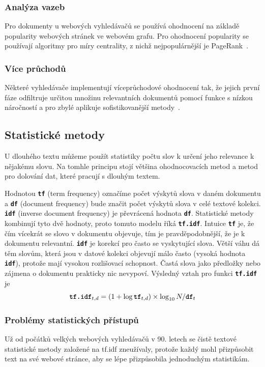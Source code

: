 \documentclass[11pt,letterpaper,oneside,openright]{book}
\newcommand{\bftt}[1]{\texttt{\textbf{#1}}}
\begin{document}
\subsubsection{Analýza vazeb}
Pro dokumenty u webových vyhledávačů se používá ohodnocení na základě
popularity webových stránek ve webovém grafu. Pro ohodnocení popularity se
používají algoritmy pro míry centrality, z nichž nejpopulárnější je
PageRank~\cite{Page99thepagerank}.

\subsubsection{Více průchodů}
Některé vyhledávače implementují víceprůchodové ohodnocení tak, že jejich první
fáze odfiltruje určitou množinu relevantních dokumentů pomocí funkce s nízkou
náročností a pro zbylé aplikuje sofistikovanější
metody~\cite{Yin:2016:RRY:2939672.2939677}.

\subsection{Statistické metody}
U dlouhého textu můžeme použít statistiky počtu slov k určení jeho relevance k
nějakému slovu. Na tomhle principu stojí většina ohodnocovacích metod a metod
pro dolování dat, které pracují s dlouhým textem.

Hodnotou \bftt{tf} (term frequency) označíme počet výskytů slova v daném
dokumentu a \bftt{df} (document frequency) bude značit počet výskytů slova v
celé textové kolekci. \bftt{idf} (inverse document frequency) je převrácená
hodnota \bftt{df}. Statistické metody kombinují tyto dvě hodnoty, proto tomuto
modelu říká \bftt{tf.idf}. Intuice \bftt{tf} je, že čím vícekrát se slovo v
dokumentu objevuje, tím je pravděpodobnější, že je k dokumentu relevantní.
\bftt{idf} je korekcí pro často se vyskytující slova. Větší váhu dá těm slovům,
která jsou v datové kolekci objevují málo často (vysoká hodnota \bftt{idf}),
protože mají vysokou rozlišovací schopnost. Častá slova jako předložky nebo
zájmena o dokumentu prakticky nic nevypoví. Výsledný vztah pro funkci
\bftt{tf.idf} je \[\bftt{tf.idf}_{t, d} = (1 + \log \bftt{tf}_{t, d}) \times
\log_{10} N / \bftt{df}_{t}\]

\subsubsection{Problémy statistických přístupů}
Už od počátků velkých webových vyhledávačů v 90. letech se čistě textové
statistické metody založené na tf.idf zneužívaly, protože každý mohl
přizpůsobit text na své webové stránce, aby se lépe přizpůsobila
jednoduchým statistikám.
\end{document}
